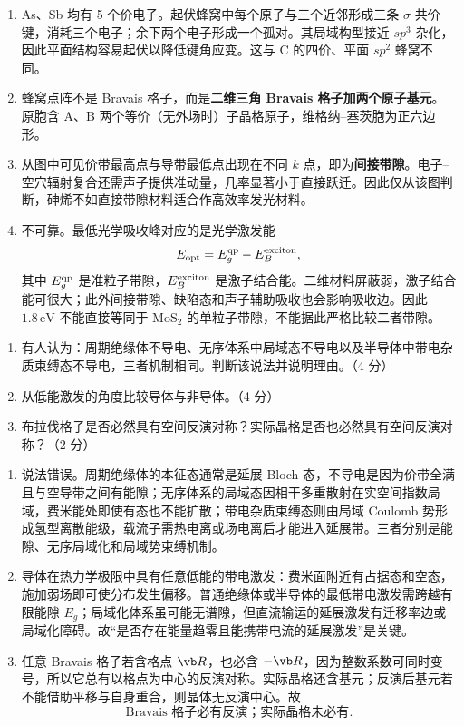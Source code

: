 \begin{question}[12 分]
\begin{solution}
\begin{enumerate}
  \item As、Sb 均有 5 个价电子。起伏蜂窝中每个原子与三个近邻形成三条 $\sigma$ 共价键，消耗三个电子；余下两个电子形成一个孤对。其局域构型接近 $sp^3$ 杂化，因此平面结构容易起伏以降低键角应变。这与 C 的四价、平面 $sp^2$ 蜂窝不同。
  \item 蜂窝点阵不是 Bravais 格子，而是\textbf{二维三角 Bravais 格子加两个原子基元}。原胞含 A、B 两个等价（无外场时）子晶格原子，维格纳--塞茨胞为正六边形。
  \item 从图中可见价带最高点与导带最低点出现在不同 $k$ 点，即为\textbf{间接带隙}。电子--空穴辐射复合还需声子提供准动量，几率显著小于直接跃迁。因此仅从该图判断，砷烯不如直接带隙材料适合作高效率发光材料。
  \item 不可靠。最低光学吸收峰对应的是光学激发能
  \[
    E_{\rm opt}=E_g^{\rm qp}-E_B^{\rm exciton},
  \]
  其中 $E_g^{\rm qp}$ 是准粒子带隙，$E_B^{\rm exciton}$ 是激子结合能。二维材料屏蔽弱，激子结合能可很大；此外间接带隙、缺陷态和声子辅助吸收也会影响吸收边。因此 $1.8\,\mathrm{eV}$ 不能直接等同于 MoS$_2$ 的单粒子带隙，不能据此严格比较二者带隙。
\end{enumerate}
\end{solution}
\end{question}

\begin{question}[10 分]
\begin{enumerate}
  \item 有人认为：周期绝缘体不导电、无序体系中局域态不导电以及半导体中带电杂质束缚态不导电，三者机制相同。判断该说法并说明理由。（4 分）
  \item 从低能激发的角度比较导体与非导体。（4 分）
  \item 布拉伐格子是否必然具有空间反演对称？实际晶格是否也必然具有空间反演对称？（2 分）
\end{enumerate}


\begin{solution}
\begin{enumerate}
  \item 说法错误。周期绝缘体的本征态通常是延展 Bloch 态，不导电是因为价带全满且与空导带之间有能隙；无序体系的局域态因相干多重散射在实空间指数局域，费米能处即使有态也不能扩散；带电杂质束缚态则由局域 Coulomb 势形成氢型离散能级，载流子需热电离或场电离后才能进入延展带。三者分别是能隙、无序局域化和局域势束缚机制。
  \item 导体在热力学极限中具有任意低能的带电激发：费米面附近有占据态和空态，施加弱场即可使分布发生偏移。普通绝缘体或半导体的最低带电激发需跨越有限能隙 $E_g$；局域化体系虽可能无谱隙，但直流输运的延展激发有迁移率边或局域化障碍。故“是否存在能量趋零且能携带电流的延展激发”是关键。
  \item 任意 Bravais 格子若含格点 $\vb R$，也必含 $-\vb R$，因为整数系数可同时变号，所以它总有以格点为中心的反演对称。实际晶格还含基元；反演后基元若不能借助平移与自身重合，则晶体无反演中心。故
  \[
    \boxed{\text{Bravais 格子必有反演；实际晶格未必有}.}
  \]
\end{enumerate}
\end{solution}
\end{question}

